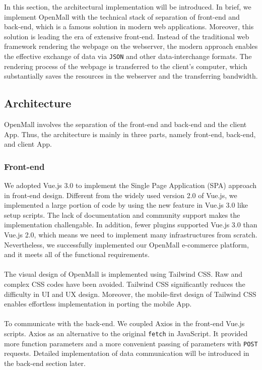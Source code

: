 \documentclass{article}
\begin{document}
In this section, the architectural implementation will be introduced. In brief, we implement OpenMall with the technical stack of separation of front-end and back-end, which is a famous solution in modern web applications. Moreover, this solution is leading the era of extensive front-end. Instead of the traditional web framework rendering the webpage on the webserver, the modern approach enables the effective exchange of data via \verb|JSON| and other data-interchange formats. The rendering process of the webpage is transferred to the client's computer, which substantially saves the resources in the webserver and the transferring bandwidth.

\subsection{Architecture}

OpenMall involves the separation of the front-end and back-end and the client App. Thus, the architecture is mainly in three parts, namely front-end, back-end, and client App.

\subsubsection{Front-end}

We adopted Vue.js 3.0 to implement the Single Page Application (SPA) \cite{spa} approach in front-end design. Different from the widely used version 2.0 of Vue.js, we implemented a large portion of code by using the new feature in Vue.js 3.0 like setup scripts. The lack of documentation and community support makes the implementation challengable. In addition, fewer plugins supported Vue.js 3.0 than Vue.js 2.0, which means we need to implement many infrastructures from scratch. Nevertheless, we successfully implemented our OpenMall e-commerce platform, and it meets all of the functional requirements.
\\\\
The visual design of OpenMall is implemented using Tailwind CSS. Raw and complex CSS codes have been avoided. Tailwind CSS significantly reduces the difficulty in UI and UX design. Moreover, the mobile-first design of Tailwind CSS enables effortless implementation in porting the mobile App.
\\\\
To communicate with the back-end. We coupled Axios in the front-end Vue.js scripts. Axios as an alternative to the original \verb|fetch| in JavaScript. It provided more function parameters and a more convenient passing of parameters with \verb|POST| requests. Detailed implementation of data communication will be introduced in the back-end section later.
\end{document}
